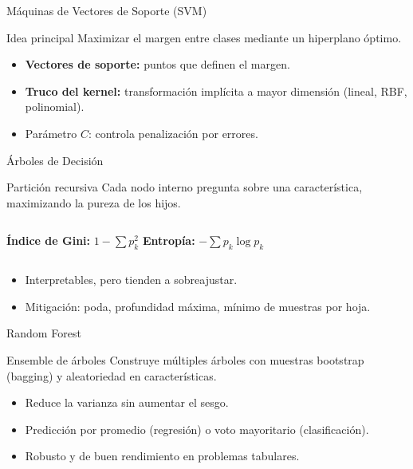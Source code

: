 \documentclass[aspectratio=169, 10pt, xcolor=table]{beamer}
\begin{document}
\begin{frame}{Máquinas de Vectores de Soporte (SVM)}
    \begin{block}{Idea principal}
        Maximizar el margen entre clases mediante un hiperplano óptimo.
    \end{block}
    \begin{itemize}
        \item \textbf{Vectores de soporte:} puntos que definen el margen.
        \item \textbf{Truco del kernel:} transformación implícita a mayor dimensión (lineal, RBF, polinomial).
        \item Parámetro $C$: controla penalización por errores.
    \end{itemize}
\end{frame}

\begin{frame}{Árboles de Decisión}
    \begin{block}{Partición recursiva}
        Cada nodo interno pregunta sobre una característica, maximizando la pureza de los hijos.
    \end{block}
    \begin{columns}[t]
        \textbf{Índice de Gini:} $1-\sum p_k^2$
        \textbf{Entropía:} $-\sum p_k\log p_k$
    \end{columns}
    \vspace{0.2cm}
    \begin{itemize}
        \item Interpretables, pero tienden a sobreajustar.
        \item Mitigación: poda, profundidad máxima, mínimo de muestras por hoja.
    \end{itemize}
\end{frame}

\begin{frame}{Random Forest}
    \begin{block}{Ensemble de árboles}
        Construye múltiples árboles con muestras bootstrap (bagging) y aleatoriedad en características.
    \end{block}
    \begin{itemize}
        \item Reduce la varianza sin aumentar el sesgo.
        \item Predicción por promedio (regresión) o voto mayoritario (clasificación).
        \item Robusto y de buen rendimiento en problemas tabulares.
    \end{itemize}
\end{frame}
\end{document}

